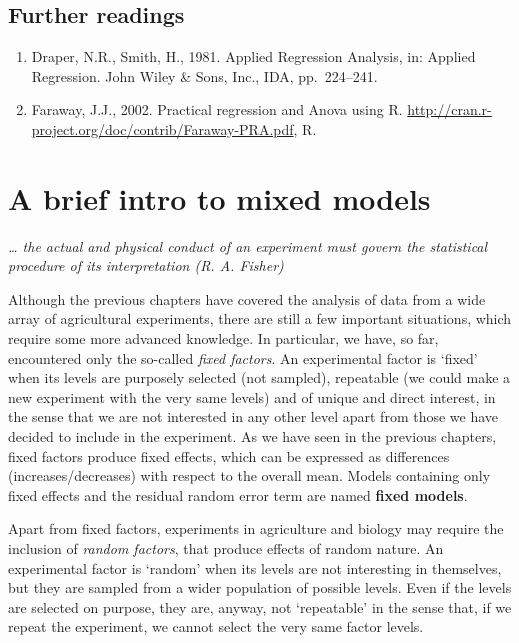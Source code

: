 \documentclass[a4paper,12pt,oneside]{book}
\providecommand{\tightlist}{%
  \setlength{\itemsep}{0pt}\setlength{\parskip}{0pt}}
\begin{document}
\hypertarget{further-readings-9}{%
\section{Further readings}\label{further-readings-9}}

\begin{enumerate}
\def\labelenumi{\arabic{enumi}.}
\tightlist
\item
  Draper, N.R., Smith, H., 1981. Applied Regression Analysis, in: Applied Regression. John Wiley \& Sons, Inc., IDA, pp.~224--241.
\item
  Faraway, J.J., 2002. Practical regression and Anova using R. \url{http://cran.r-project.org/doc/contrib/Faraway-PRA.pdf}, R.
\end{enumerate}

\hypertarget{a-brief-intro-to-mixed-models}{%
\chapter{A brief intro to mixed models}\label{a-brief-intro-to-mixed-models}}

\emph{\ldots{} the actual and physical conduct of an experiment must govern the statistical procedure of its interpretation (R. A. Fisher)}

Although the previous chapters have covered the analysis of data from a wide array of agricultural experiments, there are still a few important situations, which require some more advanced knowledge. In particular, we have, so far, encountered only the so-called \emph{fixed factors}. An experimental factor is `fixed' when its levels are purposely selected (not sampled), repeatable (we could make a new experiment with the very same levels) and of unique and direct interest, in the sense that we are not interested in any other level apart from those we have decided to include in the experiment. As we have seen in the previous chapters, fixed factors produce fixed effects, which can be expressed as differences (increases/decreases) with respect to the overall mean. Models containing only fixed effects and the residual random error term are named \textbf{fixed models}.

Apart from fixed factors, experiments in agriculture and biology may require the inclusion of \emph{random factors}, that produce effects of random nature. An experimental factor is `random' when its levels are not interesting in themselves, but they are sampled from a wider population of possible levels. Even if the levels are selected on purpose, they are, anyway, not `repeatable' in the sense that, if we repeat the experiment, we cannot select the very same factor levels.
\end{document}
